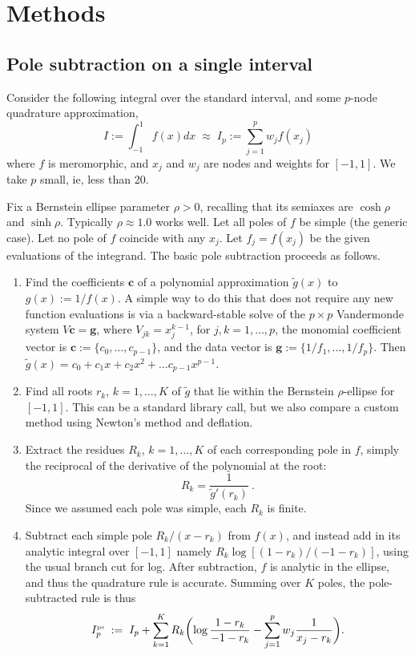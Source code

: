 \documentclass[11pt]{article}
\newcommand{\ben}{\begin{enumerate}}
\newcommand{\een}{\end{enumerate}}
\newcommand{\be}{\begin{equation}}
\newcommand{\ee}{\end{equation}}
\newcommand{\tbox}[1]{{\mbox{\tiny #1}}}
\newcommand{\mbf}[1]{{\mathbf #1}}
\begin{document}
\section{Methods}
\subsection{Pole subtraction on a single interval}

Consider the following integral over the standard interval,
and some $p$-node quadrature approximation,
\be
I := \int_{-1}^1 f(x) dx
\;\approx\;
I_p := \sum_{j=1}^p w_j f(x_j)
\label{I}
\ee
where $f$ is meromorphic, and $x_j$ and $w_j$ are nodes and weights for $[-1,1]$.
We take $p$ small, ie, less than 20.

Fix a Bernstein ellipse parameter $\rho>0$, recalling that its
semiaxes are $\cosh\rho$ and $\sinh\rho$.
Typically $\rho \approx 1.0$ works well.
Let all poles of $f$ be simple (the generic case).
Let no pole of $f$ coincide with any $x_j$.
Let $f_j = f(x_j)$ be the given evaluations of the integrand.
The basic pole subtraction proceeds as follows.
\ben
\item Find the coefficients $\mbf{c}$
  of a polynomial approximation $\tilde g(x)$ to $g(x) := 1/f(x)$.
  A simple way to do this that does not require any new function evaluations
  is via a backward-stable solve of the
  $p\times p$ Vandermonde system $V\mbf{c} = \mbf{g}$, where
  $V_{jk} = x_j^{k-1}$, for $j,k = 1,\dots,p$,
  the monomial coefficient vector is $\mbf{c} := \{c_0,\dots,c_{p-1}\}$,
  and the data vector is $\mbf{g} := \{1/f_1,\dots,1/f_p\}$.
  Then $\tilde g(x) = c_0 + c_1x + c_2 x^2 + \dots c_{p-1}x^{p-1}$.
\item
  Find all roots $r_k$, $k=1,\dots,K$
  of $\tilde g$ that lie within the Bernstein $\rho$-ellipse for $[-1,1]$.
  This can be a standard library call, but we also compare a custom method
  using Newton's method and deflation.
\item
  Extract the residues $R_k$, $k=1,\dots,K$ of each corresponding pole in $f$,
  simply the reciprocal of the derivative of the polynomial at the root:
  \be
  R_k = \frac{1}{\tilde g'(r_k)}~.
  \ee
  Since we assumed each pole was simple, each $R_k$ is finite.
\item Subtract each simple pole $R_k/(x-r_k)$ from $f(x)$, and instead
  add in its analytic integral over $[-1,1]$ namely $R_k \log[(1-r_k)/(-1-r_k)]$,
  using the usual branch cut for log.
  After subtraction, $f$ is analytic in the ellipse, and thus the quadrature
  rule is accurate.
  Summing over $K$ poles, the pole-subtracted rule is thus
  \be
  I^{\tbox{ps}}_p \;:=\;
  I_p +
  \sum_{k=1}^K R_k \biggl(
  \log\frac{1-r_k}{-1-r_k} -
  \sum_{j=1}^p w_j \frac{1}{x_j - r_k}
  \biggr).
  \label{ps}
  \ee
\een
\end{document}
